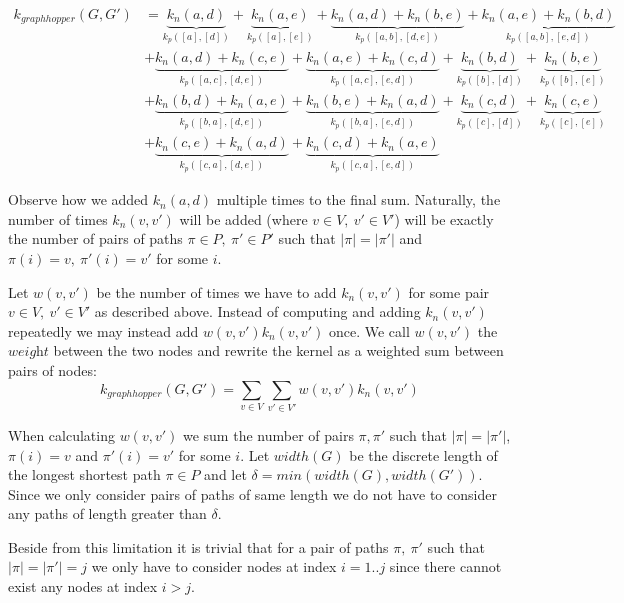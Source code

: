 \documentclass{article}
\begin{document}
\begin{equation}
\label{eq:example_sum}
\begin{split}
k_{graphhopper}(G,G')	&=  \underbrace{k_n(a,d)}_{k_p([a],[d])} + \underbrace{k_n(a, e)}_{k_p([a],[e])} + \underbrace{k_n(a, d) + k_n(b, e)}_{k_p([a,b],[d,e])} + \underbrace{k_n(a, e) + k_n(b, d)}_{k_p([a,b],[e,d])} \\ 
				&+ \underbrace{k_n(a, d) + k_n(c, e)}_{k_p([a,c],[d,e])} + \underbrace{k_n(a, e) + k_n(c, d)}_{k_p([a,c],[e,d])} + \underbrace{k_n(b, d)}_{k_p([b],[d])} + \underbrace{k_n(b, e)}_{k_p([b],[e])} \\
				&+ \underbrace{k_n(b, d) + k_n(a, e)}_{k_p([b,a],[d,e])} + \underbrace{k_n(b, e) + k_n(a, d)}_{k_p([b,a],[e,d])} + \underbrace{k_n(c, d)}_{k_p([c],[d])} + \underbrace{k_n(c, e)}_{k_p([c],[e])} \\
				&+ \underbrace{k_n(c, e) + k_n(a, d)}_{k_p([c,a],[d,e])}+ \underbrace{k_n(c, d) + k_n(a, e)}_{k_p([c,a],[e,d])}
\end{split}
\end{equation}

Observe how we added $k_n(a,d)$ multiple times to the final sum. Naturally, the number of times $k_n(v, v')$ will be added (where $v\in V,\ v'\in V'$) will be exactly the number of pairs of paths $\pi\in P,\ \pi'\in P'$ such that $|\pi|=|\pi'|$ and $\pi(i)=v,\ \pi'(i)=v'$ for some $i$.

Let $w(v, v')$ be the number of times we have to add $k_n(v, v')$ for some pair $v\in V,\ v'\in V'$ as described above. Instead of computing and adding $k_n(v, v')$ repeatedly we may instead add $w(v,v') k_n(v, v')$ once. We call $w(v, v')$ the $\textit{weight}$ between the two nodes and rewrite the kernel as a weighted sum between pairs of nodes:
\begin{equation}
\label{eq:k_graphhopper}
k_{graphhopper}(G,G')=\sum_{v\in V}\sum_{v'\in V'}w(v,v')k_n(v,v')
\end{equation}


When calculating $w(v,v')$ we sum the number of pairs $\pi,\pi'$ such that $|\pi|=|\pi'|$,  $\pi(i)=v$ and $\pi'(i)=v'$ for some $i$. Let $width(G)$ be the discrete length of the longest shortest path $\pi\in P$ and let $\delta=min(width(G), width(G'))$. Since we only consider pairs of paths of same length we do not have to consider any paths of length greater than $\delta$.

Beside from this limitation it is trivial that for a pair of paths $\pi,\ \pi'$ such that $|\pi|=|\pi'|=j$ we only have to consider nodes at index $i=1..j$ since there cannot exist any nodes at index $i>j$.
\end{document}
